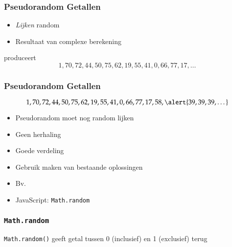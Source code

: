 \documentclass{../khlslides}
\begin{document}
\begin{frame}
  \frametitle{Pseudorandom Getallen}
  \begin{itemize}
    \item \emph{Lijken} random
    \item Resultaat van complexe berekening
  \end{itemize}
  produceert
  \[ 1, 70, 72, 44, 50, 75, 62, 19, 55, 41, 0, 66, 77, 17, \dots \]
\end{frame}

\begin{frame}
  \frametitle{Pseudorandom Getallen}
  \[ 1, 70, 72, 44, 50, 75, 62, 19, 55, 41, 0, 66, 77, 17, 58, \alert{39, 39, 39, \dots} \]
  \begin{itemize}
    \item Pseudorandom moet nog random lijken
    \item Geen herhaling
    \item Goede verdeling
  \end{itemize}
  \vskip4mm
  \begin{itemize}
    \item Gebruik maken van bestaande oplossingen
    \item Bv. \href{http://en.wikipedia.org/wiki/Mersenne_twister}{}
    \item JavaScript: {\tt Math.random}
  \end{itemize}
\end{frame}

\begin{frame}
  \frametitle{{\tt Math.random}}
  \begin{center}
    \vskip4mm
    {\tt Math.random()}
    \vskip4mm
    geeft getal tussen 0 (inclusief) en 1 (exclusief) terug
  \end{center}
\end{frame}
\end{document}

